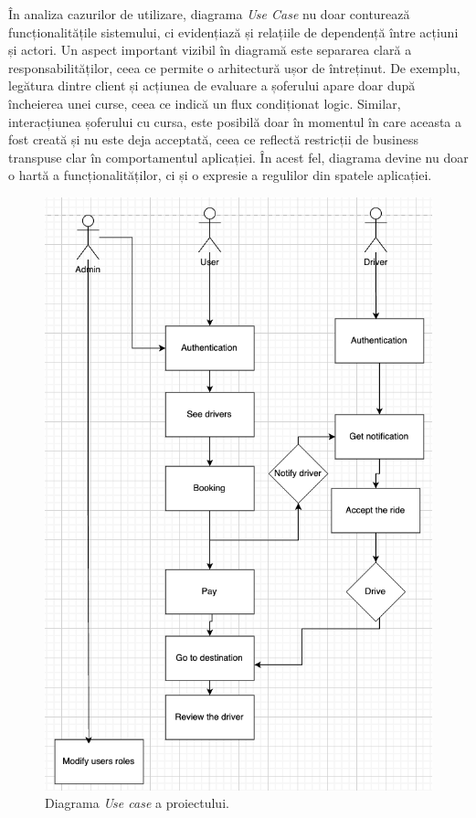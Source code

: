 În analiza cazurilor de utilizare, diagrama \textit{Use Case} nu doar conturează 
funcționalitățile sistemului, ci evidențiază și relațiile de dependență între acțiuni 
și actori. Un aspect important vizibil în diagramă este separarea clară a 
responsabilităților, ceea ce permite o arhitectură ușor de întreținut. 
De exemplu, legătura dintre client și acțiunea de evaluare a șoferului apare doar 
după încheierea unei curse, ceea ce indică un flux condiționat logic. Similar, 
interacțiunea șoferului cu cursa, este posibilă doar în momentul în care aceasta a 
fost creată și nu este deja acceptată, ceea ce reflectă restricții de business 
transpuse clar în comportamentul aplicației. În acest fel, diagrama devine nu doar o 
hartă a funcționalităților, ci și o expresie a regulilor din spatele aplicației.

\begin{figure}[H]
    \centering
    \includegraphics[width=15cm]{Assets/UserCase.png}
    \caption{Diagrama \textit{Use case} a proiectului.}
    \label{fig:UserCase}
\end{figure}

